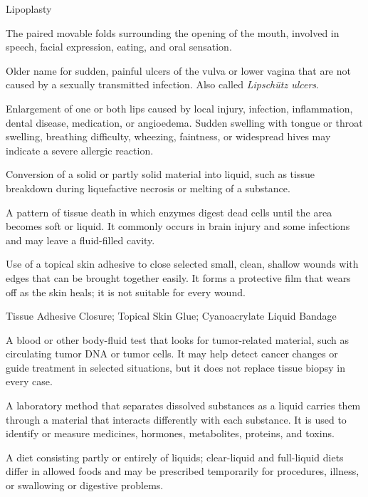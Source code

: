\synonyms
Lipoplasty

 The paired movable folds surrounding the opening of the mouth, involved in speech, facial expression, eating, and oral sensation.

 Older name for sudden, painful ulcers of the vulva or lower vagina that are not caused by a sexually transmitted infection. Also called \textit{Lipschütz ulcers}.

 Enlargement of one or both lips caused by local injury, infection, inflammation, dental disease, medication, or angioedema. Sudden swelling with tongue or throat swelling, breathing difficulty, wheezing, faintness, or widespread hives may indicate a severe allergic reaction.

 Conversion of a solid or partly solid material into liquid, such as tissue breakdown during liquefactive necrosis or melting of a substance.

 A pattern of tissue death in which enzymes digest dead cells until the area becomes soft or liquid. It commonly occurs in brain injury and some infections and may leave a fluid-filled cavity.

 Use of a topical skin adhesive to close selected small, clean, shallow wounds with edges that can be brought together easily. It forms a protective film that wears off as the skin heals; it is not suitable for every wound.

\synonyms
Tissue Adhesive Closure; Topical Skin Glue; Cyanoacrylate Liquid Bandage

 A blood or other body-fluid test that looks for tumor-related material, such as circulating tumor DNA or tumor cells. It may help detect cancer changes or guide treatment in selected situations, but it does not replace tissue biopsy in every case.

 A laboratory method that separates dissolved substances as a liquid carries them through a material that interacts differently with each substance. It is used to identify or measure medicines, hormones, metabolites, proteins, and toxins.

 A diet consisting partly or entirely of liquids; clear-liquid and full-liquid diets differ in allowed foods and may be prescribed temporarily for procedures, illness, or swallowing or digestive problems.


